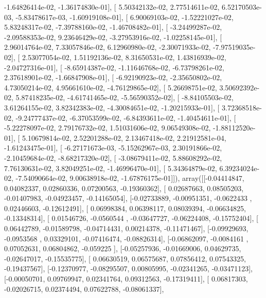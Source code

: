 \documentclass{article}
\begin{document}
         -1.64826414e-02,  -1.36174830e-01],
       [  5.50342132e-02,   2.77514611e-02,   6.52170503e-03,
         -5.83478617e-03,  -1.60919108e-01],
       [  6.90069103e-02,  -1.52221027e-02,   5.83248317e-02,
         -7.39788160e-02,  -1.46708482e-01],
       [ -3.24499287e-02,  -2.09588353e-02,   9.23646429e-02,
         -3.27953916e-02,  -1.02258145e-01],
       [  2.96014764e-02,   7.33057846e-02,   6.12960980e-02,
         -2.30071933e-02,  -7.97519035e-02],
       [  2.53077054e-02,   1.51192136e-02,   8.31650531e-02,
          1.43816939e-02,  -2.04727316e-01],
       [ -8.65914387e-02,  -1.11646768e-02,  -6.73798261e-02,
          2.37618901e-02,  -1.66847908e-01],
       [ -6.92190923e-02,  -2.35650802e-02,   4.73050214e-02,
          4.95661610e-02,  -4.76129865e-02],
       [  5.26698751e-02,   3.50692392e-02,   5.87418235e-02,
         -4.61741465e-02,  -5.56590352e-02],
       [ -8.84105503e-02,   3.61264155e-02,   3.82342383e-02,
         -4.30084651e-02,  -1.20215933e-01],
       [  3.72368518e-02,  -9.24777437e-02,  -6.37053599e-02,
         -6.84393611e-02,  -1.40454611e-01],
       [ -5.22278097e-02,   2.79176732e-02,   1.51031606e-02,
          9.06549308e-02,  -1.88112520e-01],
       [  5.10679814e-02,   2.52201288e-02,   2.13467418e-02,
          2.21912581e-04,  -1.61243475e-01],
       [ -6.27171673e-03,  -5.15262967e-03,   2.30191866e-02,
         -2.10459684e-02,  -8.68217320e-02],
       [ -3.08679411e-02,   5.88608292e-02,   7.76130631e-02,
          3.82049251e-02,  -1.46996470e-01],
       [  5.34364879e-02,   6.39234024e-02,  -7.54090664e-02,
          9.00638918e-02,  -1.67876175e-01]]), array([[-0.04414847,  0.04082337,  0.02860336,  0.07200563, -0.19360362],
       [ 0.02687663,  0.08505203, -0.01407983, -0.04923457, -0.14165054],
       [-0.02733889, -0.00951351, -0.0622433 ,  0.02446603, -0.12612491],
       [ 0.06998384,  0.06398117,  0.08039394, -0.06634825, -0.13348314],
       [ 0.01546726, -0.0560544 , -0.03647727, -0.06224408, -0.15752404],
       [ 0.06442789, -0.01589798, -0.04714431,  0.00214378, -0.11471467],
       [-0.09929693, -0.0953568 ,  0.03329101, -0.07416474, -0.08826314],
       [-0.06862097, -0.0084161 ,  0.07052631,  0.06804862, -0.059225  ],
       [-0.05257936, -0.01669006,  0.04629735, -0.02647017, -0.15535775],
       [ 0.06630519,  0.06575687,  0.07856412,  0.07543325, -0.19437567],
       [-0.12370977, -0.08295507,  0.00805995, -0.02341265, -0.03471123],
       [-0.00050701,  0.09769947,  0.02341764,  0.09312563, -0.17319411],
       [ 0.06817303, -0.02026715,  0.02374494,  0.07622788, -0.08061337],
\end{document}
